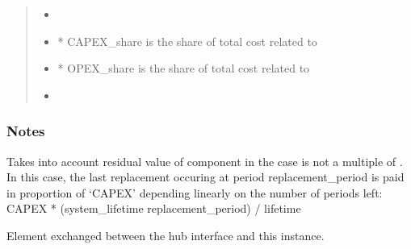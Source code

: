 \documentclass[letterpaper,10pt,english]{sphinxmanual}
\begin{document}
\begin{fulllineitems}
\begin{fulllineitems}
\begin{quote}
\begin{description}
\sphinxAtStartPar
\begin{itemize}
\item {} 
\sphinxAtStartPar
{}

\item {} 
\sphinxAtStartPar
* CAPEX\_share is the share of total cost related to 

\item {} 
\sphinxAtStartPar
* OPEX\_share is the share of total cost related to 

\item {} 
\sphinxAtStartPar
{}

\end{itemize}


\end{description}\end{quote}
\subsubsection*{Notes}

\sphinxAtStartPar
Takes into account residual value of component in the case  is not a multiple of .
In this case, the last replacement occuring at period replacement\_period is paid in proportion of ‘CAPEX’
depending linearly on the number of periods left:
CAPEX * (system\_lifetime \sphinxhyphen{} replacement\_period) / lifetime

\end{fulllineitems}


\begin{fulllineitems}
\label{\detokenize{generated/tamos.elementIO.Grid:tamos.elementIO.Grid.element}}
\pysigstartsignatures
{}
\pysigstopsignatures
\sphinxAtStartPar
Element exchanged between the hub interface and this instance.

\end{fulllineitems}



\end{fulllineitems}
\end{document}
